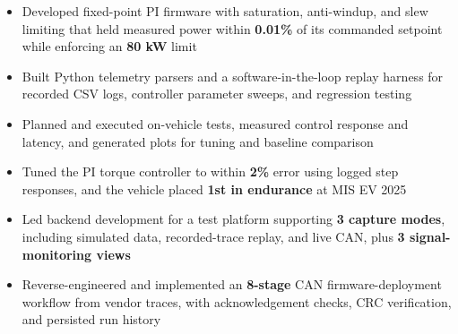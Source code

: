 \documentclass[10pt,letterpaper]{article}
\renewcommand{\entryspace}{\vspace{0pt}}
\begin{document}
\orgline{\spartanracing}
\begin{itemize}
  \item Developed fixed-point PI firmware with saturation, anti-windup, and slew limiting that held measured power within \textbf{0.01\%} of its commanded setpoint while enforcing an \textbf{80 kW} limit
  \item Built Python telemetry parsers and a software-in-the-loop replay harness for recorded CSV logs, controller parameter sweeps, and regression testing
  \item Planned and executed on-vehicle tests, measured control response and latency, and generated plots for tuning and baseline comparison
\end{itemize}

\entryspace

\orgline{\spartanracing}
\begin{itemize}
  \item Tuned the PI torque controller to within \textbf{2\%} error using logged step responses, and the vehicle placed \textbf{1st in endurance} at MIS EV 2025
\end{itemize}


\begin{itemize}
  \item Led backend development for a test platform supporting \textbf{3 capture modes}, including simulated data, recorded-trace replay, and live CAN, plus \textbf{3 signal-monitoring views}
  \item Reverse-engineered and implemented an \textbf{8-stage} CAN firmware-deployment workflow from vendor traces, with acknowledgement checks, CRC verification, and persisted run history
\end{itemize}
\end{document}
